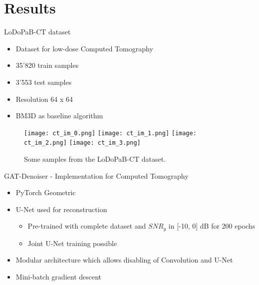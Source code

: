 
\section{Results}

\begin{frame}{LoDoPaB-CT dataset}
  \begin{itemize}
      \item Dataset for low-dose Computed Tomography
      \item 35'820 train samples
      \item 3'553 test samples
      \item Resolution 64 x 64
      \item BM3D as baseline algorithm
  \end{itemize}
  \begin{figure}
    \centering
    \hfill
    \texttt{[image: ct\_im\_0.png]}
    \hfill
    \texttt{[image: ct\_im\_1.png]}
    \hfill
    \texttt{[image: ct\_im\_2.png]}
    \hfill
    \texttt{[image: ct\_im\_3.png]}
    \hfill
    \caption{Some samples from the LoDoPaB-CT dataset.}
  \end{figure}
\end{frame}


\begin{frame}{GAT-Denoiser - Implementation for Computed Tomography}
  \begin{itemize}
    \item PyTorch Geometric
    \item U-Net used for reconstruction
    \begin{itemize}
        \item Pre-trained with complete dataset and $SNR_y$ in [-10, 0] dB for 200 epochs
        \item Joint U-Net training possible
    \end{itemize}
    \item Modular architecture which allows disabling of Convolution and U-Net
    \item Mini-batch gradient descent
    
  \end{itemize}
\end{frame}




